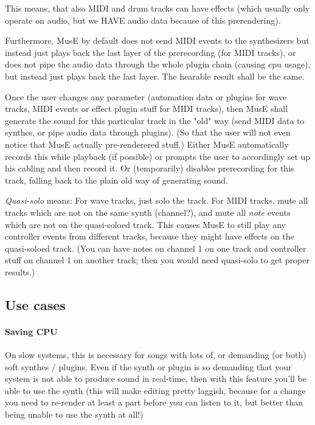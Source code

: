 \documentclass[a4paper]{report}
\begin{document}
This means, that also MIDI and drum tracks can have effects (which
usually only operate on audio, but we HAVE audio data because of this
prerendering).

Furthermore, MusE by default does not send MIDI events to the synthesizers
but instead just plays back the last layer of the prerecording (for
MIDI tracks), or does not pipe the audio data through the whole plugin
chain (causing cpu usage), but instead just plays back the last layer.
The hearable result shall be the same.

Once the user changes any parameter (automation data or plugins for
wave tracks, MIDI events or effect plugin stuff for MIDI tracks),
then MusE shall generate the sound for this particular track in the
"old" way (send MIDI data to synthes, or pipe audio data through plugins).
(So that the user will not even notice that MusE actually pre-renderered
stuff.) Either MusE automatically records this while playback (if possible)
or prompts the user to accordingly set up his cabling and then record
it. Or (temporarily) disables prerecording for this track, falling back
to the plain old way of generating sound.

\emph{Quasi-solo} means: For wave tracks, just solo the track. For MIDI
tracks, mute all tracks which are not on the same synth (channel?),
and mute all \emph{note} events which are not on the quasi-soloed track.
This causes MusE to still play any controller events from different
tracks, because they might have effects on the quasi-soloed track. (You
can have notes on channel 1 on one track and controller stuff on channel
1 on another track; then you would need quasi-solo to get proper results.)

\subsection{Use cases}
\paragraph{Saving CPU}
On slow systems, this is necessary for songs with lots of, or demanding
(or both) soft synthes / plugins. Even if the synth or plugin is so
demanding that your system is not able to produce sound in real-time,
then with this feature you'll be able to use the synth (this will make
editing pretty laggish, because for a change you need to re-render at
least a part before you can listen to it, but better than being unable
to use the synth at all!)
\end{document}
